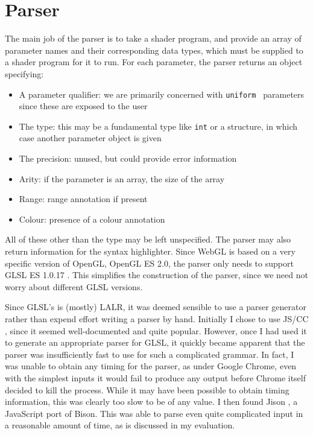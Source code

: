 \documentclass[12pt,twoside,notitlepage]{report}
\begin{document}
\section{Parser}
The main job of the parser is to take a shader program, and provide an array of parameter names and their corresponding data types, which must be supplied to a shader program for it to run. For each parameter, the parser returns an object specifying:
\begin{itemize}
  \item A parameter qualifier: we are primarily concerned with {\tt uniform } parameters since these are exposed to the user
  \item The type: this may be a fundamental type like {\tt int} or a structure, in which case another parameter object is given 
  \item The precision: unused, but could provide error information
  \item Arity: if the parameter is an array, the size of the array
  \item Range: range annotation if present
  \item Colour: presence of a colour annotation
\end{itemize}
All of these other than the type may be left unspecified. The parser may also return information for the syntax highlighter. Since WebGL is based on a very specific version of OpenGL, OpenGL ES 2.0, the parser only needs to support GLSL ES 1.0.17 \cite{glsl-spec}\cite{webgl-spec}. This simplifies the construction of the parser, since we need not worry about different GLSL versions.

Since GLSL's is (mostly) LALR, it was deemed sensible to use a parser generator rather than expend  effort writing a parser by hand. Initially I chose to use JS/CC \cite{js-cc}, since it seemed well-documented and quite popular. However, once I had used it to generate an appropriate parser for GLSL, it quickly became apparent that the parser was insufficiently fast to use for such a complicated grammar. In fact, I was unable to obtain any timing for the parser, as under Google Chrome, even with the simplest inputs it would fail to produce any output before Chrome itself decided to kill the process. While it may have been possible to obtain timing information, this was clearly too slow to be of any value. I then found Jison \cite{jison}, a JavaScript port of Bison. This was able to parse even quite complicated input in a reasonable amount of time, as is discussed in my evaluation.
\end{document}
